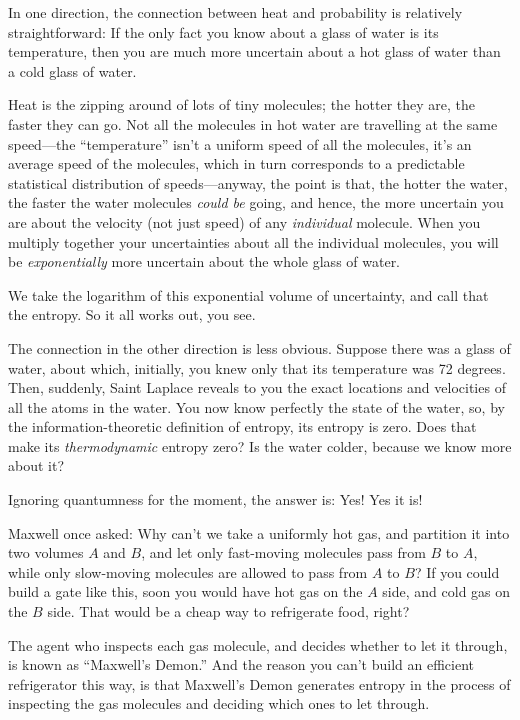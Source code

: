 {
 In one direction, the connection between heat and probability is
relatively straightforward: If the only fact you know about a glass of
water is its temperature, then you are much more uncertain about a hot
glass of water than a cold glass of water.}

{
 Heat is the zipping around of lots of tiny molecules; the hotter
they are, the faster they can go. Not all the molecules in hot water
are travelling at the same speed---the
``temperature''
isn't a uniform speed of all the molecules,
it's an average speed of the molecules, which in turn
corresponds to a predictable statistical distribution of
speeds---anyway, the point is that, the hotter the water, the faster
the water molecules \textit{could be} going, and hence, the more
uncertain you are about the velocity (not just speed) of any
\textit{individual} molecule. When you multiply together your
uncertainties about all the individual molecules, you will be
\textit{exponentially} more uncertain about the whole glass of water.}

{
 We take the logarithm of this exponential volume of uncertainty,
and call that the entropy. So it all works out, you see.}

{
 The connection in the other direction is less obvious. Suppose
there was a glass of water, about which, initially, you knew only that
its temperature was 72 degrees. Then, suddenly, Saint Laplace reveals
to you the exact locations and velocities of all the atoms in the
water. You now know perfectly the state of the water, so, by the
information-theoretic definition of entropy, its entropy is zero. Does
that make its \textit{thermodynamic} entropy zero? Is the water colder,
because we know more about it?}

{
 Ignoring quantumness for the moment, the answer is: Yes! Yes it
is!}

{
 Maxwell once asked: Why can't we take a uniformly
hot gas, and partition it into two volumes $A$ and $B$, and let only
fast-moving molecules pass from $B$ to $A$, while only slow-moving
molecules are allowed to pass from $A$ to $B$? If you could build a gate
like this, soon you would have hot gas on the $A$ side, and cold gas on
the $B$ side. That would be a cheap way to refrigerate food, right?}

{
 The agent who inspects each gas molecule, and decides whether to
let it through, is known as
``Maxwell's Demon.''
And the reason you can't build an efficient
refrigerator this way, is that Maxwell's Demon
generates entropy in the process of inspecting the gas molecules and
deciding which ones to let through.}

